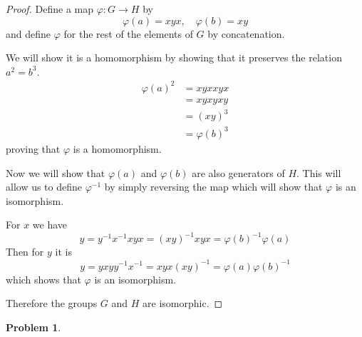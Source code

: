 \documentclass[10pt]{article}
\newcommand{\sk}{\vskip 10mm}
\theoremstyle{plain}
\newtheorem{problem}{Problem}
\theoremstyle{remark}
\begin{document}
\begin{proof}
  Define a map $\varphi:G\rightarrow H$ by
  \[ \varphi(a)=xyx,\quad \varphi(b)=xy\]
  and define $\varphi$ for the rest of the elements of $G$ by concatenation.

  We will show it is a homomorphism by showing that it preserves the relation
  $a^2=b^3$.
  \begin{align*}
    \varphi(a)^2&= xyxxyx\\
         &= xyxyxy\\
         &= (xy)^3\\
         &= \varphi(b)^3
  \end{align*}
  proving that $\varphi$ is a homomorphism.

  Now we will show that $\varphi(a)$ and $\varphi(b)$ are also generators of $H$. This
  will allow us to define $\varphi^{-1}$ by simply reversing the map which will
  show that $\varphi$ is an isomorphism.

  For $x$ we have
  \[ y = y^{-1}x^{-1}xyx = (xy)^{-1}xyx = \varphi(b)^{-1}\varphi(a)\]
  Then for $y$ it is
  \[ y = yxyy^{-1}x^{-1}=xyx(xy)^{-1} =\varphi(a)\varphi(b)^{-1}\]
  which shows that $\varphi$ is an isomorphism.

  Therefore the groups $G$ and $H$ are isomorphic.
\end{proof}

\sk

\begin{problem} %
  
\end{problem}
\end{document}
